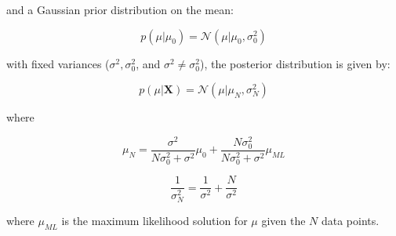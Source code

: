 \documentclass[11pt]{article}
\begin{document}
and a Gaussian prior distribution on the mean:

\begin{equation}
p(\mu|\mu_0) = \mathcal{N}(\mu|\mu_0,\sigma^{2}_{0})
\end{equation}

with fixed variances ($\sigma^2, \sigma^{2}_{0}$, and $\sigma^2 \neq \sigma^{2}_{0}$), the posterior distribution is given by:

\begin{equation}
p(\mu|\mathbf{X}) = \mathcal{N}(\mu|\mu_N,\sigma^{2}_{N})
\end{equation}

where

\begin{equation}
\mu_N = \frac{\sigma^2}{N\sigma^{2}_{0} + \sigma^2}\mu_0 + \frac{N\sigma^{2}_{0}}{N\sigma^{2}_{0} + \sigma^2}\mu_{ML}
\end{equation}

\begin{equation}
\frac{1}{\sigma^{2}_{N}} = \frac{1}{\sigma^{2}} + \frac{N}{\sigma^{2}}
\end{equation}

where $\mu_{ML}$ is the maximum likelihood solution for $\mu$ given the $N$ data points.
\end{document}
